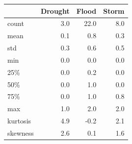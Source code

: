 \begin{table}[htbp]
\centering
{}
\label{tab:events_sum_table_laos}
\small
\begin{tabular}{lrrr}
\toprule
& \textbf{Drought} & \textbf{Flood} & \textbf{Storm} \\
\midrule
count & 3.0 & 22.0 & 8.0 \\
mean & 0.1 & 0.8 & 0.3 \\
std & 0.3 & 0.6 & 0.5 \\
min & 0.0 & 0.0 & 0.0 \\
25\% & 0.0 & 0.2 & 0.0 \\
50\% & 0.0 & 1.0 & 0.0 \\
75\% & 0.0 & 1.0 & 0.8 \\
max & 1.0 & 2.0 & 2.0 \\
kurtosis & 4.9 & -0.2 & 2.1 \\
skewness & 2.6 & 0.1 & 1.6 \\
\bottomrule
\end{tabular}
\end{table}
